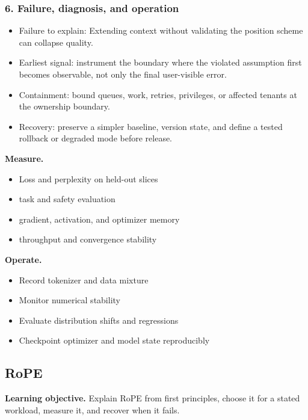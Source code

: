 \subsubsection*{6. Failure, diagnosis, and operation}
\begin{itemize}
\item Failure to explain: Extending context without validating the position scheme can collapse quality.
\item Earliest signal: instrument the boundary where the violated assumption first becomes observable, not only the final user-visible error.
\item Containment: bound queues, work, retries, privileges, or affected tenants at the ownership boundary.
\item Recovery: preserve a simpler baseline, version state, and define a tested rollback or degraded mode before release.
\end{itemize}
\textbf{Measure.}\begin{itemize}
\item Loss and perplexity on held-out slices
\item task and safety evaluation
\item gradient, activation, and optimizer memory
\item throughput and convergence stability
\end{itemize}
\textbf{Operate.}\begin{itemize}
\item Record tokenizer and data mixture
\item Monitor numerical stability
\item Evaluate distribution shifts and regressions
\item Checkpoint optimizer and model state reproducibly
\end{itemize}
\subsection{RoPE}
\textbf{Learning objective.} Explain RoPE from first principles, choose it for a stated workload, measure it, and recover when it fails.
